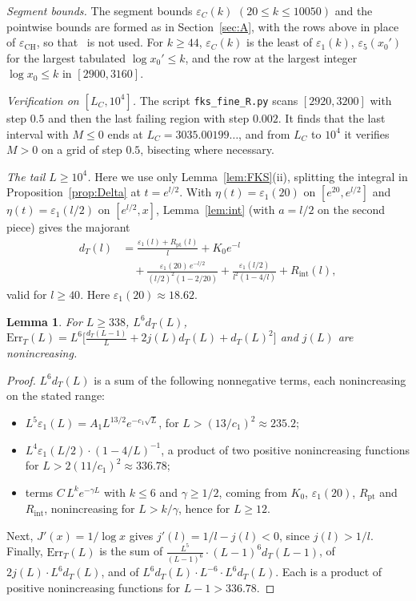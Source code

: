 \documentclass{amsart}
\newtheorem{lemma}[theorem]{Lemma}
\theoremstyle{definition}
\theoremstyle{remark}
\theoremstyle{plain}
\numberwithin{equation}{section}
\newcommand{\eps}{\varepsilon}
\newcommand{\Err}{\mathrm{Err}}
\newcommand{\Rpt}{R_{\mathrm{pt}}}
\newcommand{\Rint}{R_{\mathrm{int}}}
\newcommand{\epsCH}{\eps_{\mathrm{CH}}}
\begin{document}
\emph{Segment bounds.} The segment bounds $\eps_C(k)$ $(20\le k\le10050)$ and the pointwise bounds are formed as in Section~\ref{sec:A}, with the rows above in place of $\epsCH$, so that~\cite{CH25} is not used. For $k\ge44$, $\eps_C(k)$ is the least of $\eps_1(k)$, $\eps_5(x_0')$ for the largest tabulated $\log x_0'\le k$, and the row at the largest integer $\log x_0\le k$ in $[2900,3160]$.

\emph{Verification on $[L_C,10^4]$.} The script \texttt{fks\_fine\_R.py} scans $[2920,3200]$ with step $0.5$ and then the last failing region with step $0.002$. It finds that the last interval with $M\le0$ ends at $L_C=3035.00199\ldots$, and from $L_C$ to $10^4$ it verifies $M>0$ on a grid of step $0.5$, bisecting where necessary.

\emph{The tail $L\ge10^4$.} Here we use only Lemma~\ref{lem:FKS}(ii), splitting the integral in Proposition~\ref{prop:Delta} at $t=e^{l/2}$. With $\eta(t)=\eps_1(20)$ on $[e^{20},e^{l/2}]$ and $\eta(t)=\eps_1(l/2)$ on $[e^{l/2},x]$, Lemma~\ref{lem:int} (with $a=l/2$ on the second piece) gives the majorant
\begin{align*}
d_T(l)&=\frac{\eps_1(l)+\Rpt(l)}{l}+K_0e^{-l}\\
&\quad+\frac{\eps_1(20)\,e^{-l/2}}{(l/2)^2(1-2/20)}+\frac{\eps_1(l/2)}{l^2(1-4/l)}+\Rint(l),
\end{align*}
valid for $l\ge40$. Here $\eps_1(20)\approx18.62$.

\begin{lemma}\label{lem:mono}
For $L\ge338$, $L^6d_T(L)$, $\Err_T(L)=L^6\bigl[\frac{d_T(L-1)}{L}+2j(L)d_T(L)+d_T(L)^2\bigr]$ and $j(L)$ are nonincreasing.
\end{lemma}

\begin{proof}
$L^6d_T(L)$ is a sum of the following nonnegative terms, each nonincreasing on the stated range:
\begin{itemize}
\item $L^5\eps_1(L)=A_1L^{13/2}e^{-c_1\sqrt L}$, for $L>(13/c_1)^2\approx235.2$;
\item $L^4\eps_1(L/2)\cdot(1-4/L)^{-1}$, a product of two positive nonincreasing functions for $L>2(11/c_1)^2\approx336.78$;
\item terms $C\,L^ke^{-\gamma L}$ with $k\le6$ and $\gamma\ge1/2$, coming from $K_0$, $\eps_1(20)$, $\Rpt$ and $\Rint$, nonincreasing for $L>k/\gamma$, hence for $L\ge12$.
\end{itemize}
Next, $J'(x)=1/\log x$ gives $j'(l)=1/l-j(l)<0$, since $j(l)>1/l$. Finally, $\Err_T(L)$ is the sum of $\frac{L^5}{(L-1)^6}\cdot(L-1)^6d_T(L-1)$, of $2j(L)\cdot L^6d_T(L)$, and of $L^6d_T(L)\cdot L^{-6}\cdot L^6d_T(L)$. Each is a product of positive nonincreasing functions for $L-1>336.78$.
\end{proof}
\end{document}

